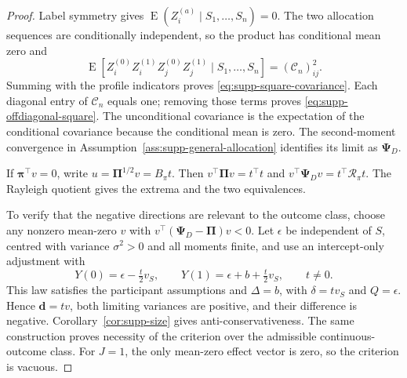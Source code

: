 \documentclass[12pt,a4paper]{article}
\theoremstyle{definition}
\theoremstyle{remark}\newtheorem{remark}{Remark}
\numberwithin{equation}{section}
\newcommand{\E}{\operatorname{E}}
\begin{document}
\begin{proof}
Label symmetry gives $\E(Z_i^{(a)}\mid S_1,\ldots,S_n)=0$. The two allocation sequences are conditionally independent, so the product has conditional mean zero and
\[
 \E[Z_i^{(0)}Z_i^{(1)}Z_j^{(0)}Z_j^{(1)}\mid S_1,\ldots,S_n]
       =(\mathcal C_n)_{ij}^2.
\]
Summing with the profile indicators proves \eqref{eq:supp-square-covariance}. Each diagonal entry of $\mathcal C_n$ equals one; removing those terms proves \eqref{eq:supp-offdiagonal-square}. The unconditional covariance is the expectation of the conditional covariance because the conditional mean is zero. The second-moment convergence in Assumption~\ref{ass:supp-general-allocation} identifies its limit as $\bm\Psi_D$.

If $\bm\pi^\top v=0$, write $u=\bm\Pi^{1/2}v=B_\pi t$. Then $v^\top\bm\Pi v=t^\top t$ and $v^\top\bm\Psi_Dv=t^\top\mathcal R_\pi t$. The Rayleigh quotient gives the extrema and the two equivalences.

To verify that the negative directions are relevant to the outcome class, choose any nonzero mean-zero $v$ with $v^\top(\bm\Psi_D-\bm\Pi)v<0$. Let $\epsilon$ be independent of $S$, centred with variance $\sigma^2>0$ and all moments finite, and use an intercept-only adjustment with
\[
 Y(0)=\epsilon-\tfrac{t}{2}v_S,\qquad
 Y(1)=\epsilon+b+\tfrac{t}{2}v_S,\qquad t\ne0.
\]
This law satisfies the participant assumptions and $\Delta=b$, with $\delta=t v_S$ and $Q=\epsilon$. Hence $\bm d=t v$, both limiting variances are positive, and their difference is negative. Corollary~\ref{cor:supp-size} gives anti-conservativeness. The same construction proves necessity of the criterion over the admissible continuous-outcome class. For $J=1$, the only mean-zero effect vector is zero, so the criterion is vacuous.
\end{proof}
\end{document}

